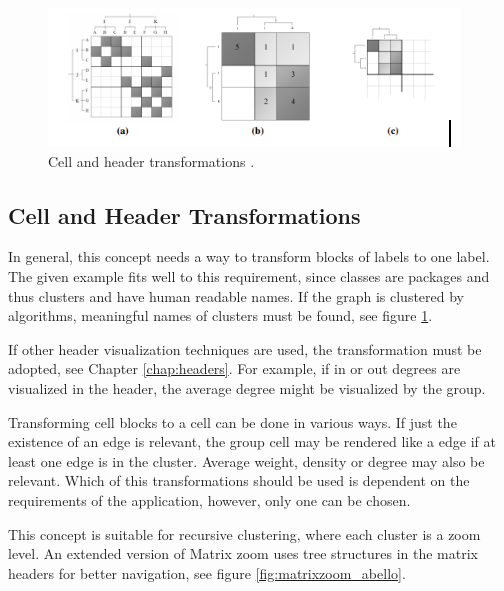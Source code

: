 \begin{figure}[h]
\centering
\includegraphics{images/matrixzoom_transform}
\caption{Cell and header transformations \citep{ham-ivis-2003}. \label{fig:matrixzoom_transform}}
\end{figure}




\subsection{Cell and Header Transformations}   
In general, this concept needs a way to transform blocks of labels to one label. The given example fits well to this requirement, since classes are packages and thus clusters and have human readable names. If the graph is clustered by algorithms, meaningful names of clusters must be found, see figure \ref{fig:matrixzoom_transform}.

If other header visualization techniques are used, the transformation must be adopted, see Chapter \ref{chap:headers}. For example, if in or out degrees are visualized in the header, the average degree might be visualized by the group.

Transforming cell blocks to a cell can be done in various ways. If just the existence of an edge is relevant, the group cell may be rendered like a edge if at least one edge is in the cluster. Average weight, density or degree may also be relevant. Which of this transformations should be used is dependent on the requirements of the application, however, only one can be chosen.

This concept is suitable for recursive clustering, where each cluster is a zoom level. An extended version of Matrix zoom  \citep{abello2004} uses tree structures in the matrix headers for better navigation, see figure \ref{fig:matrixzoom_abello}.

